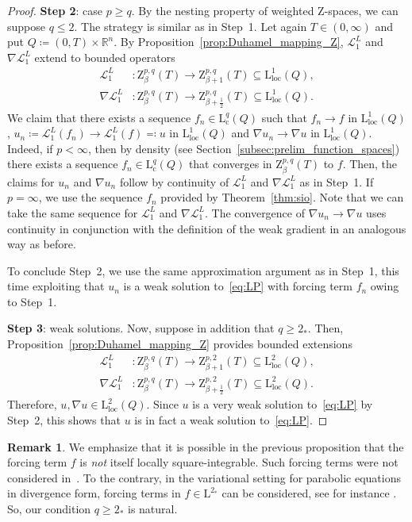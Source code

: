 \documentclass[11pt, leqno]{amsart}
\theoremstyle{definition}
\newtheorem{remark}[theorem]{Remark}
\newcommand{\R}{\mathbb{R}}
\renewcommand{\L}{\mathrm{L}}
\newcommand{\Z}{\mathrm{Z}}
\newcommand{\Soll}{\mathcal{L}}
\newcommand{\cc}{\mathrm{c}}
\newcommand{\loc}{\mathrm{loc}}
\begin{document}
\begin{proof}
		\textbf{Step 2}: case $p \geq q$. By the nesting property of weighted $\Z$-spaces, we can suppose $q \leq 2$. The strategy is similar as in Step~1. Let again $T \in (0,\infty)$ and put $Q \coloneqq (0,T) \times \R^n$.
		By Proposition~\ref{prop:Duhamel_mapping_Z}, $\Soll^L_1$ and $\nabla \Soll^L_1$ extend to bounded operators
		\begin{align}
			\Soll^L_1 &\colon \Z^{p,q}_\beta(T) \to \Z^{p,q}_{\beta + 1}(T) \subseteq \L^1_\loc(Q), \\
			\nabla \Soll^L_1 &\colon \Z^{p,q}_\beta(T) \to \Z^{p,q}_{\beta + \frac{1}{2}}(T) \subseteq \L^1_\loc(Q).
		\end{align}
		We claim that there exists a sequence $f_n \in \L^q_\cc(Q)$ such that $f_n \to f$ in $\L^1_\loc(Q)$, $u_n \coloneqq \Soll^L_1(f_n) \to \Soll^L_1(f) \eqqcolon u$ in $\L^1_\loc(Q)$ and $\nabla u_n \to \nabla u$ in $\L^1_\loc(Q)$. Indeed, if $p < \infty$, then by density (see Section~\ref{subsec:prelim_function_spaces}) there exists a sequence $f_n \in \L^q_\cc(Q)$ that converges in $\Z^{p,q}_\beta(T)$ to $f$. Then, the claims for $u_n$ and $\nabla u_n$ follow by continuity of $\Soll^L_1$ and $\nabla \Soll^L_1$ as in Step~1. If $p = \infty$, we use the sequence $f_n$ provided by Theorem~\ref{thm:sio}. Note that we can take the same sequence for $\Soll^L_1$ and $\nabla \Soll^L_1$. The convergence of $\nabla u_n \to \nabla u$ uses continuity in conjunction with the definition of the weak gradient in an analogous way as before.

		To conclude Step~2, we use the same approximation argument as in Step~1, this time exploiting that $u_n$ is a weak solution to~\eqref{eq:LP} with forcing term $f_n$ owing to Step~1.

		\textbf{Step 3}: weak solutions. Now, suppose in addition that $q \geq 2_*$. Then, Proposition~\ref{prop:Duhamel_mapping_Z} provides bounded extensions %
		\begin{align}
			\Soll^L_1 &\colon \Z^{p,q}_\beta(T) \to \Z^{p,2}_{\beta + 1}(T) \subseteq \L^2_\loc(Q), \\
			\nabla \Soll^L_1 &\colon \Z^{p,q}_\beta(T) \to \Z^{p,2}_{\beta + \frac{1}{2}}(T) \subseteq \L^2_\loc(Q).
		\end{align}
		Therefore, $u, \nabla u \in \L^2_\loc(Q)$. Since $u$ is a very weak solution to~\eqref{eq:LP} by Step~2, this shows that $u$ is in fact a weak solution to~\eqref{eq:LP}.
	\end{proof}

	\begin{remark}
		We emphasize that it is possible in the previous proposition that the forcing term $f$ is \emph{not} itself locally square-integrable. Such forcing terms were not considered in~\cite{AH2}.
		{To the contrary, in the variational setting for parabolic equations in divergence form, forcing terms in $f\in \L^{2_*}$ can be considered, see for instance \cite{ABES19}.
		So, our condition $q\ge 2_{*}$ is natural.}
	\end{remark}
\end{document}
